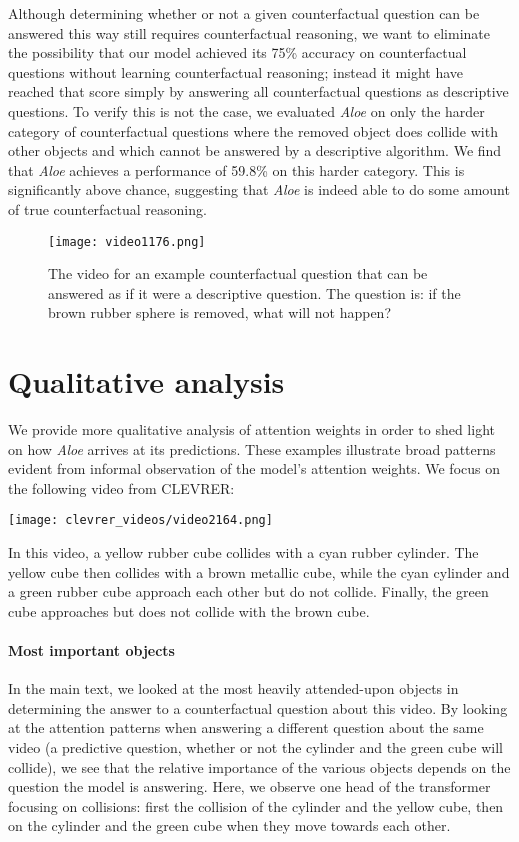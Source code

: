 \documentclass{article}
\newcommand{\Model}{\emph{Aloe}}
\begin{document}
Although determining whether or not a given counterfactual question
can be answered this way still requires counterfactual reasoning,
we want to eliminate the possibility that
our model achieved its 75\% accuracy on counterfactual questions
without learning counterfactual reasoning;
instead
it might have reached that score simply by answering all counterfactual questions as descriptive questions.
To verify this is not the case, we evaluated \Model{} on
only the harder category of counterfactual questions
where the removed object does collide with other objects
and which cannot be answered by a descriptive algorithm.
We find that \Model{}
achieves a performance of 59.8\%
on this harder category. This is significantly above chance,
suggesting that \Model{} is indeed able to do some amount
of true counterfactual reasoning.

\begin{figure}
    \centering
    \texttt{[image: video1176.png]}
    \caption{The video for an example counterfactual question that can be answered as if it were a descriptive question. The question is: if the brown rubber sphere is removed, what will not happen?
  }
    \label{fig:example-counterfactual}
\end{figure}


\section{Qualitative analysis}
\label{section:qualitative-analysis}
We provide more qualitative analysis of attention weights in order to shed light on how \Model{} arrives at its predictions.
These examples illustrate broad patterns evident from informal observation of the model's attention weights.
We focus on the following video from CLEVRER:

\texttt{[image: clevrer\_videos/video2164.png]}

In this video, a yellow rubber cube collides with a cyan rubber cylinder. The yellow cube then collides with a brown metallic cube, while the cyan cylinder and a green rubber cube approach each other but do not collide. Finally, the green cube approaches but does not collide with the brown cube.

\paragraph{Most important objects}
In the main text, we looked at the most heavily attended-upon objects
in determining the answer to a counterfactual question about this video. 
By looking at the attention patterns when answering a different question about the same video
(a predictive question, whether or not the cylinder and the green cube will collide),
we see that the relative importance of the various objects depends on the question the model is answering.
Here, we observe one head of the transformer focusing on collisions:
first the collision of the cylinder and the yellow cube,
then on the cylinder and the green cube when they move towards each other.
\end{document}
